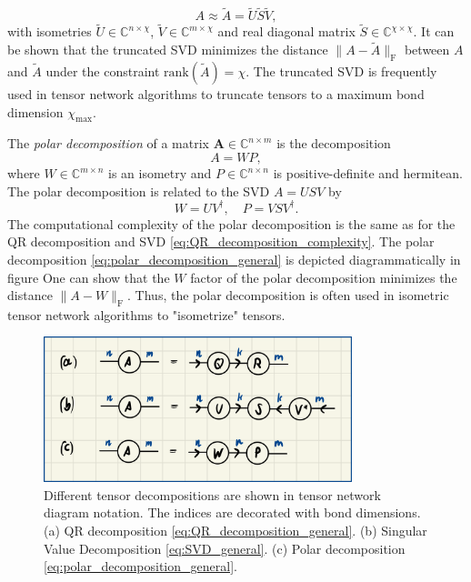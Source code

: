 \begin{equation}
	\label{eq:truncated_SVD_general}
	A \approx \tilde{A} = \tilde{U}\tilde{S}\tilde{V},
\end{equation}
with isometries $\tilde{U}\in\mathbb{C}^{n\times\chi}$, $\tilde{V}\in\mathbb{C}^{m\times\chi}$ and real diagonal matrix $\tilde{S}\in\mathbb{C}^{\chi\times\chi}$. It can be shown \cite{cite:eckart_young_theorem} that the truncated SVD minimizes the distance $\lVert A - \tilde{A} \rVert_\text{F}$ between $A$ and $\tilde{A}$ under the constraint $\text{rank}(\tilde{A}) = \chi$. The truncated SVD is frequently used in tensor network algorithms to truncate tensors to a maximum bond dimension $\chi_\text{max}$. \par
The \textit{polar decomposition} of a matrix $\bm{A} \in \mathbb{C}^{n\times m}$ is the decomposition
\begin{equation}
	\label{eq:polar_decomposition_general}
	A = WP,
\end{equation}
where $W\in\mathbb{C}^{m\times n}$ is an isometry and $P\in\mathbb{C}^{n\times n}$ is positive-definite and hermitean. The polar decomposition is related to the SVD $A = USV$ by
\begin{equation}
	\label{eq:polar_decomposition_connection_to_svd}
	W = UV^\dagger, \quad P = VSV^\dagger.
\end{equation}
The computational complexity of the polar decomposition is the same as for the QR decomposition and SVD \eqref{eq:QR_decomposition_complexity}. The polar decomposition \eqref{eq:polar_decomposition_general} is depicted diagrammatically in figure  One can show  that the $W$ factor of the polar decomposition minimizes the distance $\lVert A-W\rVert_\text{F}$. Thus, the polar decomposition is often used in isometric tensor network algorithms to "isometrize" tensors.
\begin{figure}
	\centering
	\includegraphics[width=0.8\textwidth]{figures/Tensor_Networks/tensor_decomposition_diagrams.jpeg}
	\caption{Different tensor decompositions are shown in tensor network diagram notation. The indices are decorated with bond dimensions. (a) QR decomposition \eqref{eq:QR_decomposition_general}. (b) Singular Value Decomposition \eqref{eq:SVD_general}. (c) Polar decomposition \eqref{eq:polar_decomposition_general}.}
	\label{fig:tensor_decomposition_diagrams}
\end{figure}